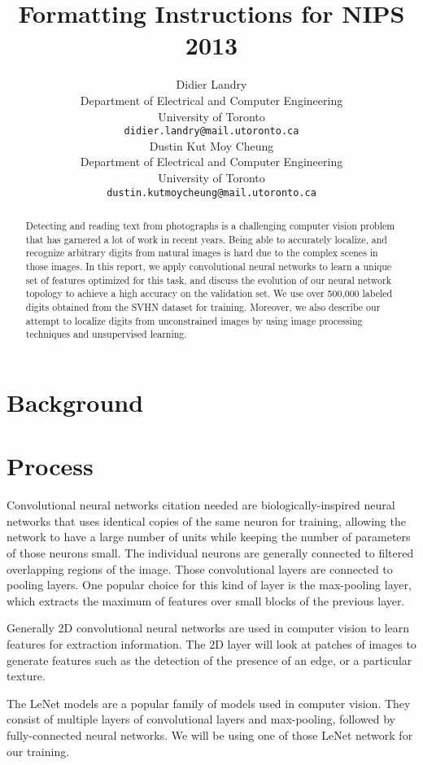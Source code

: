 \documentclass{article} %
\title{Formatting Instructions for NIPS 2013}
\author{
Didier Landry\\
Department of Electrical and Computer Engineering\\
University of Toronto\\
\texttt{didier.landry@mail.utoronto.ca} \\
\And
Dustin Kut Moy Cheung\\
Department of Electrical and Computer Engineering\\
University of Toronto\\
\texttt{dustin.kutmoycheung@mail.utoronto.ca} \\
}
\begin{document}
\maketitle

\begin{abstract}
Detecting and reading text from photographs is a challenging computer vision problem that has garnered a lot of work in recent years. Being able to accurately localize, and recognize arbitrary digits from natural images is hard due to the complex scenes in those images. In this report, we apply convolutional neural networks to learn a unique set of features optimized for this task, and discuss the evolution of our neural network topology to achieve a high accuracy on the validation set. We use over 500,000 labeled digits obtained from the SVHN\cite{svhn} dataset for training. Moreover, we also describe our attempt to localize digits from unconstrained images by using image processing techniques and unsupervised learning.
\end{abstract}

\section{Background}
\section{Process}
Convolutional neural networks {citation needed} are biologically-inspired neural networks that uses identical copies of the same neuron for training, allowing the network to have a large number of units while keeping the number of parameters of those neurons small. The individual neurons are generally connected to filtered overlapping regions of the image. Those convolutional layers are connected to pooling layers. One popular choice for this kind of layer is the max-pooling layer, which extracts the maximum of features over small blocks of the previous layer.

Generally 2D convolutional neural networks are used in computer vision to learn features for extraction information. The 2D layer will look at patches of images to generate features such as the detection of the presence of an edge, or a particular texture.

The LeNet models are a popular family of models used in computer vision. They consist of multiple layers of convolutional layers and max-pooling, followed by fully-connected neural networks. We will be using one of those LeNet network for our training.
\end{document}
